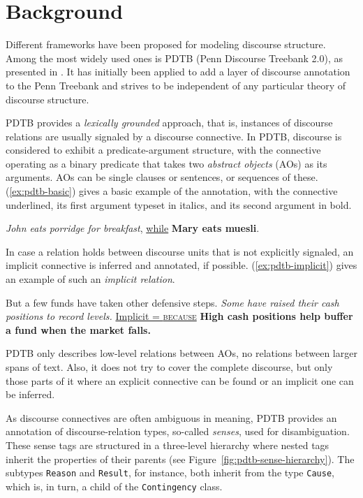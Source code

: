 \documentclass[
    a4paper,%
    12pt,%
    oneside,%
    toc=bibliography,
    final,
]{scrartcl}
\begin{document}
\section{Background}
\label{sec:background}

Different frameworks have been proposed for modeling discourse structure. Among the most widely used ones is PDTB (Penn Discourse Treebank 2.0), as presented in \citet{Prasad2008}. It has initially been applied to add a layer of discourse annotation to the Penn Treebank \citep{Marcus1993} and strives to be independent of any particular theory of discourse structure.

PDTB provides a \textit{lexically grounded} approach, that is, instances of discourse relations are usually signaled by a discourse connective. In PDTB, discourse is considered to exhibit a predicate-argument structure, with the connective operating as a binary predicate that takes two \textit{abstract objects} (AOs) as its arguments. AOs can be single clauses or sentences, or sequences of these. (\ref{ex:pdtb-basic}) \citep[taken from][3]{Webber2006} gives a basic example of the annotation, with the connective underlined, its first argument typeset in italics, and its second argument in bold.

\begin{exe}
\ex \label{ex:pdtb-basic} \textit{John eats porridge for breakfast}, \underline{while} \textbf{Mary eats muesli}.
\end{exe}

In case a relation holds between discourse units that is not explicitly signaled, an implicit connective is inferred and annotated, if possible. (\ref{ex:pdtb-implicit}) \citep[from][3]{Prasad2008} gives an example of such an \textit{implicit relation}.

\begin{exe}
\ex \label{ex:pdtb-implicit} But a few funds have taken other defensive steps. \textit{Some have raised their cash positions to record levels.} \underline{Implicit = \textsc{because}} \textbf{High cash positions help buffer a fund when the market falls.}
\end{exe}

PDTB only describes low-level relations between AOs, no relations between larger spans of text. Also, it does not try to cover the complete discourse, but only those parts of it where an explicit connective can be found or an implicit one can be inferred.

As discourse connectives are often ambiguous in meaning, PDTB provides an annotation of discourse-relation types, so-called \textit{senses}, used for disambiguation. These sense tags are structured in a three-level hierarchy where nested tags inherit the properties of their parents (see Figure~\ref{fig:pdtb-sense-hierarchy}). The subtypes \lstinline|Reason| and \lstinline|Result|, for instance, both inherit from the type \lstinline|Cause|, which is, in turn, a child of the \lstinline|Contingency| class.
\end{document}
